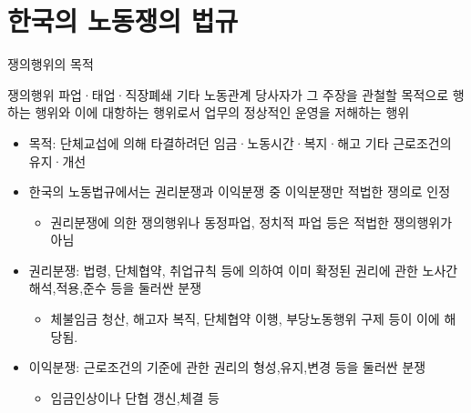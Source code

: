\documentclass[aspectratio=169,xcolor=dvipsnames,handout]{beamer}
\begin{document}
\section{한국의 노동쟁의 법규}%

\begin{frame}[allowframebreaks]{쟁의행위의 목적}
    \begin{block}{쟁의행위}
        파업·태업·직장폐쇄 기타 노동관계 당사자가 그 주장을 관철할 목적으로 행하는 행위와 이에 대항하는 행위로서 업무의 정상적인 운영을 저해하는 행위
    \end{block}
    \begin{itemize}[<+->]
        \item 목적: 단체교섭에 의해 타결하려던 임금·노동시간·복지·해고 기타 근로조건의 유지·개선
        \item 한국의 노동법규에서는 권리분쟁과 이익분쟁 중 이익분쟁만 적법한 쟁의로 인정
        \begin{itemize}[<+->]
            \item 권리분쟁에 의한 쟁의행위나 동정파업, 정치적 파업 등은 적법한 쟁의행위가 아님
        \end{itemize}
        \item  권리분쟁: 법령, 단체협약, 취업규칙 등에 의하여 이미 확정된 권리에 관한 노사간 해석,적용,준수 등을 둘러싼 분쟁 
        \begin{itemize}[<+->]
            \item 체불임금 청산, 해고자 복직, 단체협약 이행, 부당노동행위 구제 등이 이에 해당됨.
        \end{itemize}
        \item 이익분쟁: 근로조건의 기준에 관한 권리의 형성,유지,변경 등을 둘러싼 분쟁
        \begin{itemize}[<+->]
            \item 임금인상이나 단협 갱신,체결 등
        \end{itemize}
    \end{itemize}
\end{frame}
\end{document}
